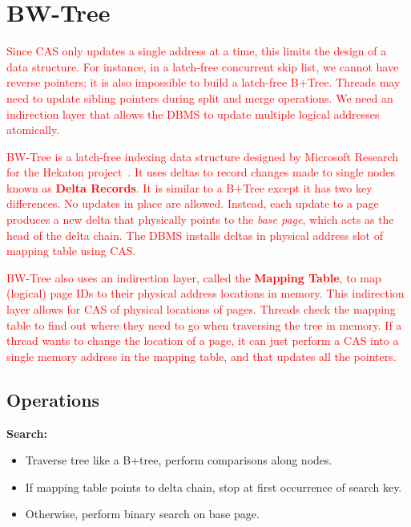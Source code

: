 \documentclass[11pt]{article}
\newcommand{\rr}[1]{\textcolor{red}{#1}}
\begin{document}
\section{BW-Tree}
\rr{Since CAS only updates a single address at a time, this limits the design of a data structure. For instance, in a latch-free concurrent skip list, we cannot have reverse pointers; it is also impossible to build a latch-free B+Tree. Threads may need to update sibling pointers during split and merge operations. We need an indirection layer that allows the DBMS to update multiple logical addresses atomically.}

\rr{BW-Tree is a latch-free indexing data structure designed by Microsoft Research for the Hekaton project~\cite{bwtree-icde2013}. It uses deltas to record changes made to single nodes known as \textbf{Delta Records}. It is similar to a B+Tree except it has two key differences. No updates in place are allowed. Instead, each update to a page produces a new delta that physically points to the \textit{base page}, which acts as the head of the delta chain. The DBMS installs deltas in physical address slot of mapping table using CAS.}

\rr{BW-Tree also uses an indirection layer, called the \textbf{Mapping Table}, to map (logical) page IDs to their physical address locations in memory. This indirection layer allows for CAS of physical locations of pages. Threads check the mapping table to find out where they need to go when traversing the tree in memory.  If a thread wants to change the location of a page, it can just perform a CAS into a single memory address in the mapping table, and that updates all the pointers.}

\subsection*{Operations}
\textbf{Search:}
\begin{itemize}
    \item
    Traverse tree like a B+tree, perform comparisons along nodes.
    
    \item
    If mapping table points to delta chain, stop at first occurrence of search key.
    
    \item
    Otherwise, perform binary search on base page.
\end{itemize}
\end{document}
